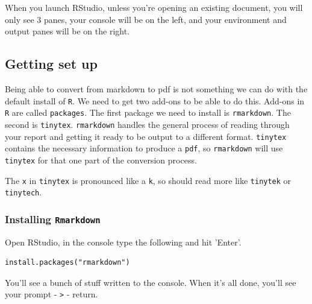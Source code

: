 \documentclass[
]{book}
\begin{document}
When you launch RStudio, unless you're opening an existing document, you will only see 3 panes, your console will be on the left, and your environment and output panes will be on the right.

\hypertarget{getting-set-up}{%
\subsection*{Getting set up}\label{getting-set-up}}

Being able to convert from markdown to pdf is not something we can do with the default install of \texttt{R}. We need to get two add-ons to be able to do this. Add-ons in \texttt{R} are called \texttt{packages}. The first package we need to install is \texttt{rmarkdown}. The second is \texttt{tinytex}. \texttt{rmarkdown} handles the general process of reading through your report and getting it ready to be output to a different format. \texttt{tinytex} contains the necessary information to produce a \texttt{pdf}, so \texttt{rmarkdown} will use \texttt{tinytex} for that one part of the conversion process.

The \texttt{x} in \texttt{tinytex} is pronounced like a \texttt{k}, so should read more like \texttt{tinytek} or \texttt{tinytech}.

\hypertarget{installing-rmarkdown}{%
\subsubsection*{\texorpdfstring{Installing \texttt{Rmarkdown}}{Installing Rmarkdown}}\label{installing-rmarkdown}}

Open RStudio, in the console type the following and hit 'Enter'.

\begin{verbatim}
install.packages("rmarkdown")
\end{verbatim}

You'll see a bunch of stuff written to the console. When it's all done, you'll see your prompt - \texttt{\textgreater{}} - return.
\end{document}
